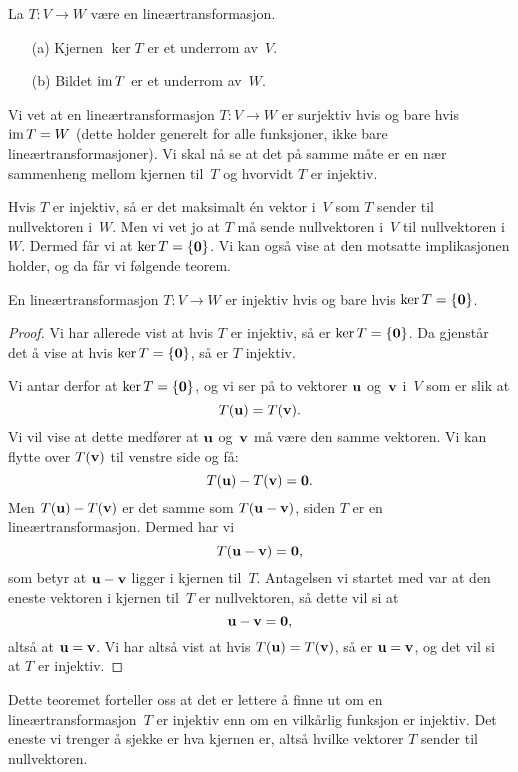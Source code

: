 \begin{thm}
La $T \colon V \to W$ være en lineærtransformasjon.
\begin{enumerate}
\item[(a)] Kjernen $\ker T$ er et underrom av~$V$.
\item[(b)] Bildet $\operatorname{im} T$ er et underrom av~$W$.
\end{enumerate}
\end{thm}

Vi vet at en lineærtransformasjon $T \colon V \to W$ er surjektiv hvis
og bare hvis $\operatorname{im} T = W$ (dette holder generelt for alle funksjoner,
ikke bare lineærtransformasjoner).  Vi skal nå se at det på samme måte
er en nær sammenheng mellom kjernen til~$T$ og hvorvidt $T$ er
injektiv.

Hvis $T$ er injektiv, så er det maksimalt én vektor i~$V$ som $T$
sender til nullvektoren i~$W$.  Men vi vet jo at $T$ må sende
nullvektoren i~$V$ til nullvektoren i~$W$.  Dermed får vi at
$\ker T = \{ \mathbf{0} \}$.  Vi kan også vise at den motsatte implikasjonen
holder, og da får vi følgende teorem.

\begin{thm}
En lineærtransformasjon $T \colon V \to W$ er injektiv hvis og bare
hvis $\ker T = \{ \mathbf{0} \}$.
\end{thm}
\begin{proof}
Vi har allerede vist at hvis $T$ er injektiv, så er
$\ker T = \{ \mathbf{0} \}$.  Da gjenstår det å vise at hvis
$\ker T = \{ \mathbf{0} \}$, så er $T$ injektiv.

Vi antar derfor at $\ker T = \{ \mathbf{0} \}$, og vi ser på to vektorer $\mathbf{u}$
og~$\mathbf{v}$ i~$V$ som er slik at
\[
T(\mathbf{u}) = T(\mathbf{v}).
\]
Vi vil vise at dette medfører at $\mathbf{u}$ og~$\mathbf{v}$ må være den samme
vektoren.  Vi kan flytte over $T(\mathbf{v})$ til venstre side og få:
\[
T(\mathbf{u}) - T(\mathbf{v}) = \mathbf{0}.
\]
Men $T(\mathbf{u}) - T(\mathbf{v})$ er det samme som $T(\mathbf{u}-\mathbf{v})$, siden $T$ er en
lineærtransformasjon.  Dermed har vi
\[
T(\mathbf{u} - \mathbf{v}) = \mathbf{0},
\]
som betyr at $\mathbf{u} - \mathbf{v}$ ligger i kjernen til~$T$.  Antagelsen vi
startet med var at den eneste vektoren i kjernen til~$T$ er
nullvektoren, så dette vil si at
\[
\mathbf{u} - \mathbf{v} = \mathbf{0},
\]
altså at $\mathbf{u} = \mathbf{v}$.  Vi har altså vist at hvis $T(\mathbf{u}) = T(\mathbf{v})$, så er
$\mathbf{u} = \mathbf{v}$, og det vil si at $T$ er injektiv.
\end{proof}

Dette teoremet forteller oss at det er lettere å finne ut om en
lineærtransformasjon~$T$ er injektiv enn om en vilkårlig funksjon er
injektiv.  Det eneste vi trenger å sjekke er hva kjernen er, altså
hvilke vektorer $T$ sender til nullvektoren.


